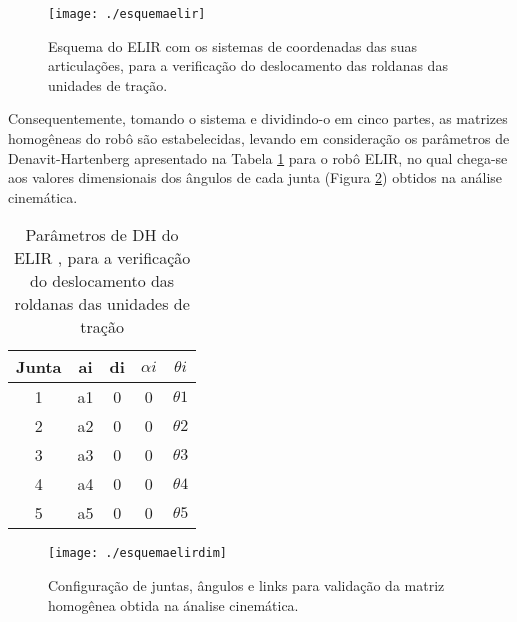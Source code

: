 \begin{figure} [h!]	
	\caption{Esquema do ELIR  com os sistemas de coordenadas das suas articulações, para a verificação do deslocamento das roldanas das unidades de tração.}
	\label{img:esquemaelir}											 
	\centering													 
	\texttt{[image: ./esquemaelir]}
\end{figure}													 

Consequentemente, tomando o sistema e dividindo-o em cinco partes, as matrizes homogêneas do robô são estabelecidas, levando em consideração os parâmetros de Denavit-Hartenberg apresentado na Tabela \ref{tab:parametrodhelir} para o robô ELIR, no qual chega-se aos valores dimensionais dos ângulos de cada junta (Figura \ref{img:esquemaelirdim}) obtidos na análise cinemática.

\begin{table}[htb!]
	\caption{Parâmetros de DH do ELIR , para a verificação do deslocamento das roldanas das unidades de tração}
	\label{tab:parametrodhelir}
	\centering
	\begin{tabular}{c|c|c|c|c}
		Junta    & ai & di & $\alpha i$ & $\theta  i$ \\ \hline
		1        & a1 & 0  & 0        & $\theta 1$  \\
		2        & a2 & 0  & 0        & $\theta 2$  \\
		3        & a3 & 0  & 0        & $\theta 3$  \\
		4        & a4 & 0  & 0        & $\theta 4$  \\
		5        & a5 & 0  & 0        & $\theta 5$  \\ \hline
	\end{tabular}
\end{table}

\begin{figure} [h!]	
	\caption{Configuração de juntas, ângulos e links para validação da matriz homogênea obtida na ánalise cinemática.}
	\label{img:esquemaelirdim}											 
	\centering													 
	\texttt{[image: ./esquemaelirdim]}
\end{figure}													 

